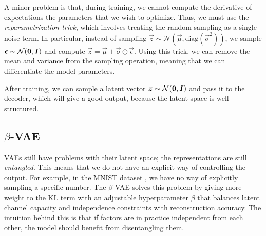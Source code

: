 A minor problem is that, during training, we cannot compute the derivative of expectations \wrt the
parameters that we wish to optimize. Thus, we must use the \textit{reparametrization trick}, which
involves treating the random sampling as a single noise term. In particular, instead of sampling
$\vec{z} \sim \mathcal{N}(\vec{\mu}, \mathrm{diag}(\vec{\sigma}^2))$, we sample $\bm{\epsilon}
    \sim \mathcal{N}(\bm{0},\bm{I})$ and compute $\vec{z} = \vec{\mu} + \vec{\sigma} \odot
    \vec{\epsilon}$. Using this trick, we can remove the mean and variance from the sampling operation,
meaning that we can differentiate \wrt the model parameters.

After training, we can sample a latent vector $\bm{z} \sim \mathcal{N}(\bm{0}, \bm{I})$ and pass
it to the decoder, which will give a good output, because the latent space is well-structured.

\subsection{$\beta$-VAE}

VAEs still have problems with their latent space; the representations are still
\textit{entangled}. This means that we do not have an explicit way of controlling the output.
For example, in the MNIST dataset \citep{deng2012mnist}, we have no way of explicitly sampling a
specific number. The $\beta$-VAE \citep{higgins2017beta} solves this problem by giving more weight
to the KL term with an adjustable hyperparameter $\beta$ that balances latent channel capacity and
independence constraints with reconstruction accuracy. The intuition behind this is that if factors
are in practice independent from each other, the model should benefit from disentangling them.

